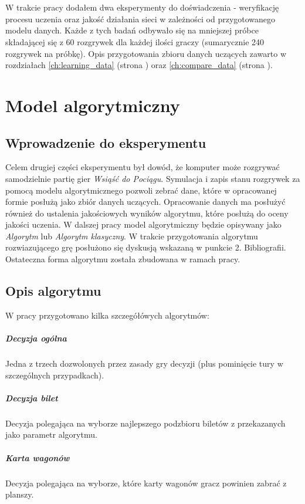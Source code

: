 \documentclass[12pt, oneside]{report}
\begin{document}
\\ \\ W trakcie pracy dodałem dwa eksperymenty do doświadczenia - weryfikację procesu uczenia oraz jakość działania sieci w zależności od przygotowanego modelu danych. Każde z tych badań odbywało się na mniejszej próbce składającej się z 60 rozgrywek dla każdej ilości graczy (sumarycznie 240 rozgrywek na próbkę). Opis przygotowania zbioru danych uczących zawarto w rozdziałach \ref{ch:learning_data} (strona \pageref{ch:learning_data}) oraz \ref{ch:compare_data} (strona \pageref{ch:compare_data}).

\chapter{Model algorytmiczny}
\label{model:algo}
\section{Wprowadzenie do eksperymentu}
Celem drugiej części eksperymentu był dowód, że komputer może rozgrywać samodzielnie partię gier \textit{Wsiąść do Pociągu}. Symulacja i zapis stanu rozgrywek za pomocą modelu algorytmicznego pozwoli zebrać dane, które w opracowanej formie posłużą jako zbiór danych uczących. Opracowanie danych ma posłużyć również do ustalenia jakościowych wyników algorytmu, które posłużą do oceny jakości uczenia. W dalszej pracy model algorytmiczny będzie opisywany jako \textit{Algorytm} lub \textit{Algorytm klasyczny}. W trakcie przygotowania algorytmu rozwiazującego grę posłużono się dyskusją wskazaną w punkcie 2. Bibliografii. Ostateczna forma algorytmu została zbudowana w ramach pracy.
\section{Opis algorytmu}
W pracy przygotowano kilka szczegółówych algorytmów:
\paragraph{Decyzja ogólna} Jedna z trzech dozwolonych przez zasady gry decyzji (plus pominięcie tury w szczególnych przypadkach).
\paragraph{Decyzja bilet} Decyzja polegająca na wyborze najlepszego podzbioru biletów z przekazanych jako parametr algorytmu.
\paragraph{Karta wagonów} Decyzja polegająca na wyborze, które karty wagonów gracz powinien zabrać z planszy.
\end{document}
